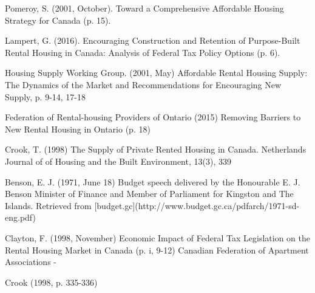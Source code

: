 \begin{thebibliography}{9}
 Pomeroy, S. (2001, October). Toward a Comprehensive Affordable Housing Strategy for Canada (p. 15).

Lampert, G. (2016). Encouraging Construction and Retention of Purpose-Built Rental Housing in Canada: Analysis of Federal Tax Policy Options (p. 6). 

 Housing Supply Working Group. (2001, May) Affordable Rental Housing Supply: The Dynamics of the Market and Recommendations for Encouraging New Supply, p. 9-14, 17-18

 Federation of Rental-housing Providers of Ontario (2015) Removing Barriers to New Rental Housing in Ontario (p. 18)

 Crook, T. (1998) The Supply of Private Rented Housing in Canada. Netherlands Journal of of Housing and the Built Environment, 13(3), 339

 Benson, E. J. (1971, June 18) Budget speech delivered by the Honourable E. J. Benson Minister of Finance and Member of Parliament for Kingston and The Islands. Retrieved from [budget.gc](http://www.budget.gc.ca/pdfarch/1971-sd-eng.pdf)

 Clayton, F. (1998, November) Economic Impact of Federal Tax Legislation on the Rental Housing Market in Canada (p. i, 9-12) Canadian Federation of Apartment Associations - %


 Crook (1998, p. 335-336)

\end{thebibliography}

